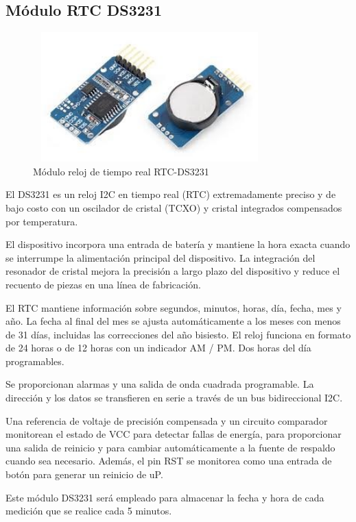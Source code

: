 \subsection{Módulo RTC DS3231}

\begin{figure}[H]
    \centering
    \includegraphics[width=9cm, height=5cm]{imagenes/RTC.jpg}
    \caption{Módulo reloj de tiempo real RTC-DS3231}
    \label{imag:RTC-DS3231}
\end{figure}

El DS3231 es un reloj I2C en tiempo real (RTC) extremadamente preciso y de bajo costo con un oscilador de cristal (TCXO) y cristal integrados compensados por temperatura.

El dispositivo incorpora una entrada de batería y mantiene la hora exacta cuando se interrumpe la alimentación principal del dispositivo. La integración del resonador de cristal mejora la precisión a largo plazo del dispositivo y reduce el recuento de piezas en una línea de fabricación.

El RTC mantiene información sobre segundos, minutos, horas, día, fecha, mes y año. La fecha al final del mes se ajusta automáticamente a los meses con menos de 31 días, incluidas las correcciones del año bisiesto. El reloj funciona en formato de 24 horas o de 12 horas con un indicador AM / PM. Dos horas del día programables.

Se proporcionan alarmas y una salida de onda cuadrada programable. La dirección y los datos se transfieren en serie a través de un bus bidireccional I2C.

Una referencia de voltaje de precisión compensada y un circuito comparador monitorean el estado de VCC para detectar fallas de energía, para proporcionar una salida de reinicio y para cambiar automáticamente a la fuente de respaldo cuando sea necesario. Además, el pin RST se monitorea como una entrada de botón para generar un reinicio de uP.

Este módulo DS3231 será empleado para almacenar la fecha y hora de cada medición que se realice cada 5 minutos.

